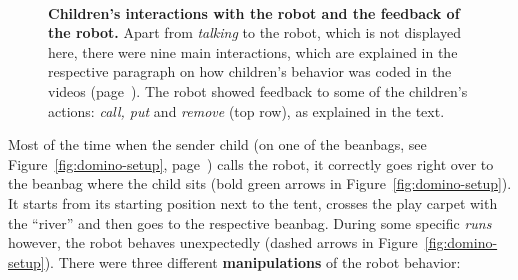 \documentclass{sig-alternate}
\begin{document}
\begin{figure}[!b]
  \bigskip

  \\  

  \caption[Children's Interactions with the Robot and the Feedback of the
  Robot]{\small \textbf{Children's interactions with the robot and the feedback
  of the robot.} Apart from \textit{talking} to the robot, which is not
  displayed here, there were nine main interactions, which are explained in the
  respective paragraph on how children's behavior was coded in the videos
  (page~\pageref{sec:domino-coding}). The robot showed feedback to some of the
  children's actions: \textit{call, put} and \textit{remove} (top row), as
  explained in the text.}

  \label{fig:domino-actions}
\end{figure}	

Most of the time when the sender child (on one of the beanbags, see
Figure~\ref{fig:domino-setup}, page~\pageref{fig:domino-setup}) calls the robot,
it correctly goes right over to the beanbag where the child sits (bold green
arrows in Figure~\ref{fig:domino-setup}). It starts from its starting position
next to the tent, crosses the play carpet with the ``river'' and then goes to
the respective beanbag. During some specific \textit{runs} however, the robot
behaves unexpectedly (dashed arrows in Figure~\ref{fig:domino-setup}). There
were three different \textbf{manipulations} of the robot behavior:
\end{document}
